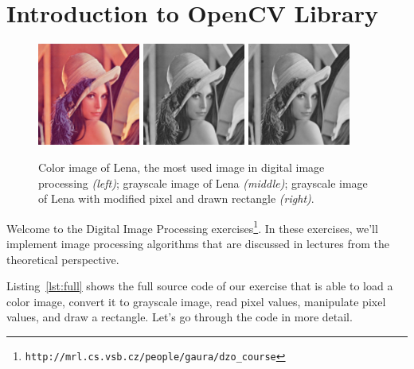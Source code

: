 \documentclass[10pt]{article}
\begin{document}
\section*{Introduction to OpenCV Library}

\begin{figure}[th]
\begin{center}
    \includegraphics[width=0.3\textwidth]{lena} \includegraphics[width=0.3\textwidth]{lena_gray} \includegraphics[width=0.3\textwidth]{gray_8uc1_img} 

    \caption{Color image of Lena, the most used image in digital image processing \textit{(left)};
    grayscale image of Lena \textit{(middle)}; grayscale image of Lena with modified pixel and drawn rectangle \textit{(right)}.}
    \label{img:lena}
\end{center}
\end{figure}

Welcome to the Digital Image Processing exercises\footnote{\texttt{http://mrl.cs.vsb.cz/people/gaura/dzo\_course}}.
In these exercises, we'll implement image processing algorithms that are discussed in lectures from the theoretical perspective.

Listing~\ref{lst:full} shows the full source code of our exercise that is able to load a color image,
convert it to grayscale image, read pixel values,
manipulate pixel values, and draw a rectangle. Let's go through the code in more detail.
\end{document}
